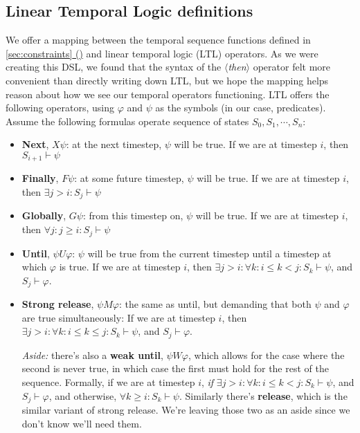 \documentclass{article}
\newcommand{\dsl}[1]{{\it $\langle$#1$\rangle$}}
\newcommand*{\fullref}[1]{\hyperref[{#1}]{\autoref*{#1} (\nameref*{#1})}} %
\begin{document}
\subsection{Linear Temporal Logic definitions}
We offer a mapping between the temporal sequence functions defined in \fullref{sec:constraints} and linear temporal logic (LTL) operators. 
As we were creating this DSL, we found that the syntax of the \dsl{then} operator felt more convenient than directly writing down LTL, but we hope the mapping helps reason about how we see our temporal operators functioning. 
LTL offers the following operators, using $\varphi$ and $\psi$ as the symbols (in our case, predicates). 
Assume the following formulas operate sequence of states $S_0, S_1, \cdots, S_n$: 
\begin{itemize}
    \item \textbf{Next}, $X \psi$: at the next timestep, $\psi$ will be true. If we are at timestep $i$, then $S_{i+1} \vdash \psi$
    
    \item \textbf{Finally}, $F \psi$: at some future timestep, $\psi$ will be true. If we are at timestep $i$, then $\exists j > i:  S_{j} \vdash \psi$
    
    \item \textbf{Globally}, $G \psi$: from this timestep on, $\psi$ will be true. If we are at timestep $i$, then $\forall j: j \geq i: S_{j} \vdash \psi$
    
    \item \textbf{Until}, $\psi U \varphi$: $\psi$ will be true from the current timestep until a timestep at which $\varphi$ is true. If we are at timestep $i$, then $\exists j > i: \forall k: i \leq k < j: S_k \vdash \psi$, and $S_j \vdash \varphi$.
    \item \textbf{Strong release}, $\psi M \varphi$: the same as until, but demanding that both $\psi$ and $\varphi$ are true simultaneously: If we are at timestep $i$, then $\exists j > i: \forall k: i \leq k \leq j: S_k \vdash \psi$, and $S_j \vdash \varphi$. 
    
    \textit{Aside:} there's also a \textbf{weak until}, $\psi W \varphi$, which allows for the case where the second is never true, in which case the first must hold for the rest of the sequence. Formally, if we are at timestep $i$, \textit{if} $\exists j > i: \forall k: i \leq k < j: S_k \vdash \psi$, and $S_j \vdash \varphi$, and otherwise, $\forall k \geq i: S_k \vdash \psi$. Similarly there's \textbf{release}, which is the similar variant of strong release. We're leaving those two as an aside since we don't know we'll need them. 
    
\end{itemize}
\end{document}
